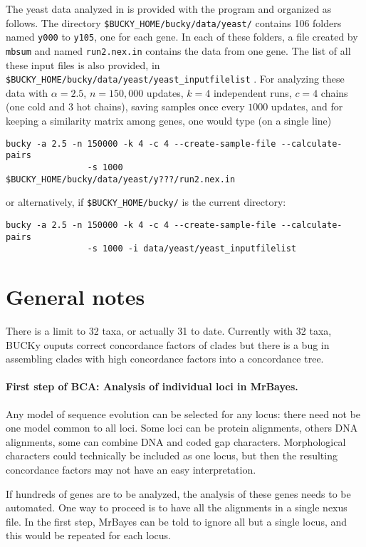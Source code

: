 \documentclass[12pt,english,final,letterpaper]{article}
\newcommand{\cf}{concordance factor}
\newcommand{\bu}{BUCKy}
\begin{document}
The yeast data analyzed in \cite{ane-etal-2007} is provided with the program
and organized as follows. The directory
\verb+$BUCKY_HOME/bucky/data/yeast/+ %
contains 106 folders named {\tt y000} to {\tt y105}, one for each gene. 
In each of these folders, a file created by {\tt mbsum} and named 
{\tt run2.nex.in} contains the data from one gene.
The list of all these input files is also provided, in 
\verb+$BUCKY_HOME/bucky/data/yeast/yeast_inputfilelist+ .
For analyzing these data with $\alpha=2.5$, 
$n=150,000$ updates, $k=4$ independent runs, $c=4$ chains 
(one cold and 3 hot chains),
saving samples once every $1000$ updates, and for keeping a similarity 
matrix among genes, one would type (on a single line)
\begin{verbatim}
bucky -a 2.5 -n 150000 -k 4 -c 4 --create-sample-file --calculate-pairs
                -s 1000   $BUCKY_HOME/bucky/data/yeast/y???/run2.nex.in
\end{verbatim}%
or alternatively, if \verb+$BUCKY_HOME/bucky/+ is the current directory:%
\begin{verbatim}
bucky -a 2.5 -n 150000 -k 4 -c 4 --create-sample-file --calculate-pairs
                -s 1000 -i data/yeast/yeast_inputfilelist
\end{verbatim}

\section{General notes}

There is a limit to 32 taxa, or actually 31 to date.
Currently with 32 taxa, \bu{} ouputs correct \cf{}s of clades 
but there is a bug in assembling clades with high \cf{}s 
into a concordance tree. 


\paragraph{First step of BCA: Analysis of individual loci in MrBayes.}
Any model of sequence evolution can be selected for any locus: there need 
not be one model common to all loci. Some loci can be protein alignments,
others DNA alignments, some can combine DNA and coded gap characters.
Morphological characters could technically be included as one locus, 
but then the resulting concordance factors may not have an
easy interpretation.

If hundreds of genes are to be analyzed, the analysis of these
genes needs to be automated. One way to proceed is to have 
all the alignments in a single nexus file. In the first step, MrBayes 
can be told to ignore all but a single locus, and this would be repeated 
for each locus.
\end{document}
